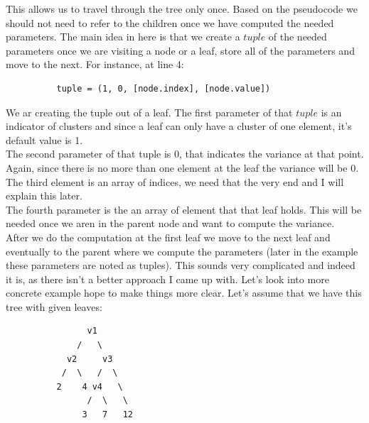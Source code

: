 \documentclass[11pt,a4paper,english]{article}
\begin{document}
        This allows us to travel through the tree only once. Based on the pseudocode we should not need to refer to the children once we have computed the needed parameters. The main idea in here is that we create a $tuple$ of the needed parameters once we are visiting a node or a leaf, store all of the parameters and move to the next. For instance, at line 4:
        \begin{verbatim}
          tuple = (1, 0, [node.index], [node.value])
        \end{verbatim}
        We ar creating the tuple out of a leaf. The first parameter of that $tuple$ is an indicator of clusters and since a leaf can only have a cluster of one element, it's default value is 1. \\
        The second parameter of that tuple is $0$, that indicates the variance at that point. Again, since there is no more than one element at the leaf the variance will be $0$. \\
        The third element is an array of indices, we need that the very end and I will explain this later. \\
        The fourth parameter is the an array of element that that leaf holds. This will be needed once we aren in the parent node and want to compute the variance.\\
        After we do the computation at the first leaf we move to the next leaf and eventually to the parent where we compute the parameters (later in the example these parameters are noted as tuples).
        This sounds very complicated and indeed it is, as there isn't a better approach I came up with. Let's look into more concrete example hope to make things more clear. Let's assume that we have this tree with given leaves:
        \begin{verbatim}
                v1
              /   \
            v2     v3
           /  \   /  \
          2    4 v4   \
                /  \   \
               3   7   12
        \end{verbatim}
\end{document}
